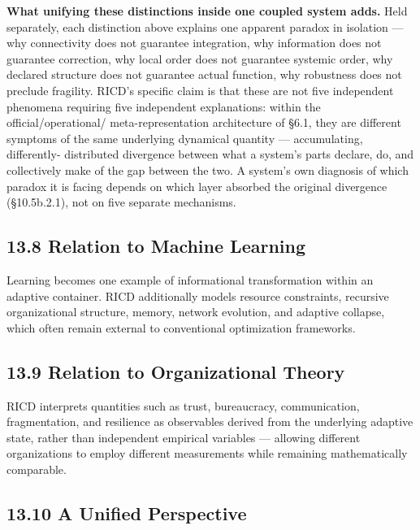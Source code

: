 \documentclass[
]{article}
\begin{document}
\textbf{What unifying these distinctions inside one coupled system
adds.} Held separately, each distinction above explains one apparent
paradox in isolation --- why connectivity does not guarantee
integration, why information does not guarantee correction, why local
order does not guarantee systemic order, why declared structure does not
guarantee actual function, why robustness does not preclude fragility.
RICD's specific claim is that these are not five independent phenomena
requiring five independent explanations: within the
official/operational/ meta-representation architecture of §6.1, they are
different symptoms of the same underlying dynamical quantity ---
accumulating, differently- distributed divergence between what a
system's parts declare, do, and collectively make of the gap between the
two. A system's own diagnosis of which paradox it is facing depends on
which layer absorbed the original divergence (§10.5b.2.1), not on five
separate mechanisms.

\hypertarget{relation-to-machine-learning}{%
\subsection{13.8 Relation to Machine
Learning}\label{relation-to-machine-learning}}

Learning becomes one example of informational transformation within an
adaptive container. RICD additionally models resource constraints,
recursive organizational structure, memory, network evolution, and
adaptive collapse, which often remain external to conventional
optimization frameworks.

\hypertarget{relation-to-organizational-theory}{%
\subsection{13.9 Relation to Organizational
Theory}\label{relation-to-organizational-theory}}

RICD interprets quantities such as trust, bureaucracy, communication,
fragmentation, and resilience as observables derived from the underlying
adaptive state, rather than independent empirical variables --- allowing
different organizations to employ different measurements while remaining
mathematically comparable.

\hypertarget{a-unified-perspective}{%
\subsection{13.10 A Unified Perspective}\label{a-unified-perspective}}
\end{document}
